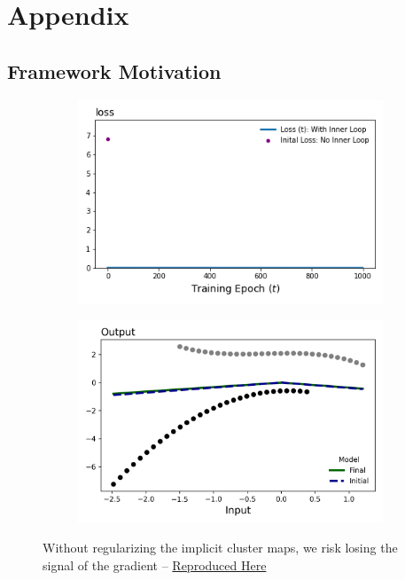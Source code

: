 \documentclass[a4paper,12pt]{article}
\begin{document}
%

\section{Appendix}
\subsection{Framework Motivation}
\begin{figure}[htbp]
\centering
\begin{subfigure}{.48\textwidth}
    \centering
    \includegraphics[width=.95\linewidth]{figures/framework/full_inner_loop.png}
    \caption{}
\end{subfigure}
\begin{subfigure}{.48\textwidth}
    \centering
    \includegraphics[width=.95\linewidth]{figures/framework/full_inner_loop_models.png}
    \caption{}
\end{subfigure}
\caption{Without regularizing the implicit cluster maps, we risk losing the signal of the gradient -- \href{https://github.com/pharringtonp19/rfp/blob/main/notebooks/Missing_Gradients.ipynb}{Reproduced Here}}
\label{fig:Missinggrads}
\end{figure}
\end{document}

